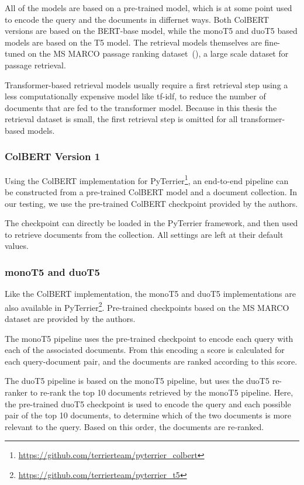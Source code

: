 All of the models are based on a pre-trained model, which is at some point used to encode the query and the documents in differnet ways.
Both ColBERT versions are based on the BERT-base model, while the monoT5 and duoT5 based models are based on the T5 model.
The retrieval models themselves are fine-tuned on the MS MARCO passage ranking dataset~(\cite{bajaj:2016:MSMARCO}), a large scale dataset for passage retrieval.

Transformer-based retrieval models usually require a first retrieval step using a less computationally expensive model like tf-idf, to reduce the number of documents that are fed to the transformer model.
Because in this thesis the retrieval dataset is small, the first retrieval step is omitted for all transformer-based models.

\subsubsection{ColBERT Version 1}
Using the ColBERT implementation for PyTerrier\footnote{\url{https://github.com/terrierteam/pyterrier_colbert}}, an end-to-end pipeline can be constructed from a pre-trained ColBERT model and a document collection.
In our testing, we use the pre-trained ColBERT checkpoint provided by the authors.

The checkpoint can directly be loaded in the PyTerrier framework, and then used to retrieve documents from the collection.
All settings are left at their default values.

\subsubsection{monoT5 and duoT5}
Like the ColBERT implementation, the monoT5 and duoT5 implementations are also available in PyTerrier\footnote{\url{https://github.com/terrierteam/pyterrier_t5}}.
Pre-trained checkpoints based on the MS MARCO dataset are provided by the authors.

The monoT5 pipeline uses the pre-trained checkpoint to encode each query with each of the associated documents.
From this encoding a score is calculated for each query-document pair, and the documents are ranked according to this score.

The duoT5 pipeline is based on the monoT5 pipeline, but uses the duoT5 re-ranker to re-rank the top 10 documents retrieved by the monoT5 pipeline.
Here, the pre-trained duoT5 checkpoint is used to encode the query and each possible pair of the top 10 documents, to determine which of the two documents is more relevant to the query.
Based on this order, the documents are re-ranked.

